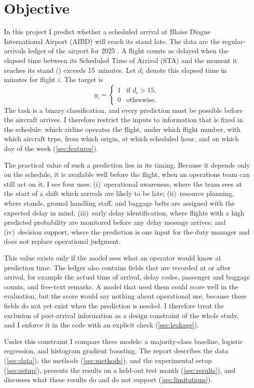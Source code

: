 \section{Objective}\label{sec:objective}

In this project I predict whether a scheduled arrival at Blaise Diagne International Airport (AIBD) will reach its stand late. The data are the regular-arrivals ledger of the airport for 2025 \citep{aibd2025ledger}. A flight counts as delayed when the elapsed time between its Scheduled Time of Arrival (STA) and the moment it reaches its stand (\blockon) exceeds 15~minutes. Let $d_i$ denote this elapsed time in minutes for flight $i$. The target is
\begin{equation}\label{eq:target}
  y_i =
  \begin{cases}
    1 & \text{if } d_i > 15,\\
    0 & \text{otherwise.}
  \end{cases}
\end{equation}
The task is a binary classification, and every prediction must be possible before the aircraft arrives. I therefore restrict the inputs to information that is fixed in the schedule: which airline operates the flight, under which flight number, with which aircraft type, from which origin, at which scheduled hour, and on which day of the week (\cref{sec:features}).

The practical value of such a prediction lies in its timing. Because it depends only on the schedule, it is available well before the flight, when an operations team can still act on it. I see four uses: (i)~operational awareness, where the team sees at the start of a shift which arrivals are likely to be late; (ii)~resource planning, where stands, ground handling staff, and baggage belts are assigned with the expected delay in mind; (iii)~early delay identification, where flights with a high predicted probability are monitored before any delay message arrives; and (iv)~decision support, where the prediction is one input for the duty manager and does not replace operational judgment.

This value exists only if the model sees what an operator would know at prediction time. The ledger also contains fields that are recorded at or after arrival, for example the actual time of arrival, delay codes, passenger and baggage counts, and free-text remarks. A model that used them could score well in the evaluation, but the score would say nothing about operational use, because these fields do not yet exist when the prediction is needed. I therefore treat the exclusion of post-arrival information as a design constraint of the whole study, and I enforce it in the code with an explicit check (\cref{sec:leakage}).

Under this constraint I compare three models: a majority-class baseline, logistic regression, and histogram gradient boosting. The report describes the data (\cref{sec:data}), the methods (\cref{sec:methods}), and the experimental setup (\cref{sec:setup}), presents the results on a held-out test month (\cref{sec:results}), and discusses what these results do and do not support (\cref{sec:limitations}).

